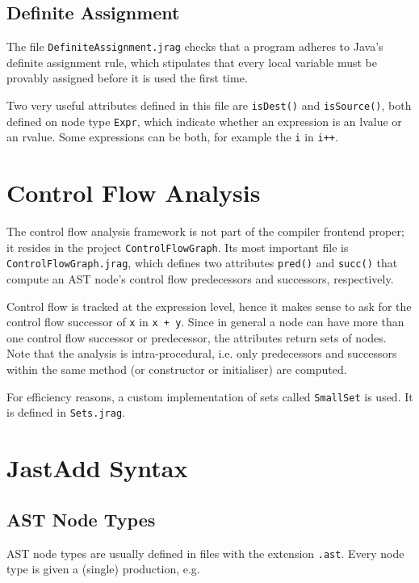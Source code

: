 \documentclass{article}
\newcommand{\file}[1]{\texttt{#1}}
\newcommand{\nt}[1]{\texttt{#1}}
\newcommand{\code}[1]{\lstinline$#1$}
\begin{document}
\subsection{Definite Assignment}

The file \file{DefiniteAssignment.jrag} checks that a program adheres to
Java's definite assignment rule, which stipulates that every local variable
must be provably assigned before it is used the first time.

Two very useful attributes defined in this file are \code{isDest()} and
\code{isSource()}, both defined on node type \nt{Expr}, which indicate
whether an expression is an lvalue or an rvalue. Some expressions can be
both, for example the \code{i} in \code{i++}.

\section{Control Flow Analysis}

The control flow analysis framework is not part of the compiler frontend
proper; it resides in the project \file{ControlFlowGraph}. Its most important
file is \linebreak
\file{ControlFlowGraph.jrag}, which defines two attributes
\file{pred()} and \file{succ()} that compute an AST node's control flow
predecessors and successors, respectively.

Control flow is tracked at the expression level, hence it makes sense to ask
for the control flow successor of \code{x} in \code{x + y}. Since in
general a node can have more than one control flow successor or predecessor,
the attributes return sets of nodes. Note that the analysis is
intra-procedural, i.e. only predecessors and successors within the same
method (or constructor or initialiser) are computed.

For efficiency reasons, a custom implementation of sets
called \code{SmallSet} is used. It is defined in \code{Sets.jrag}.

\appendix

\section{JastAdd Syntax}

\subsection{AST Node Types}
AST node types are usually defined in files with the extension \file{.ast}. Every node type is given a (single) production, e.g.
\end{document}
